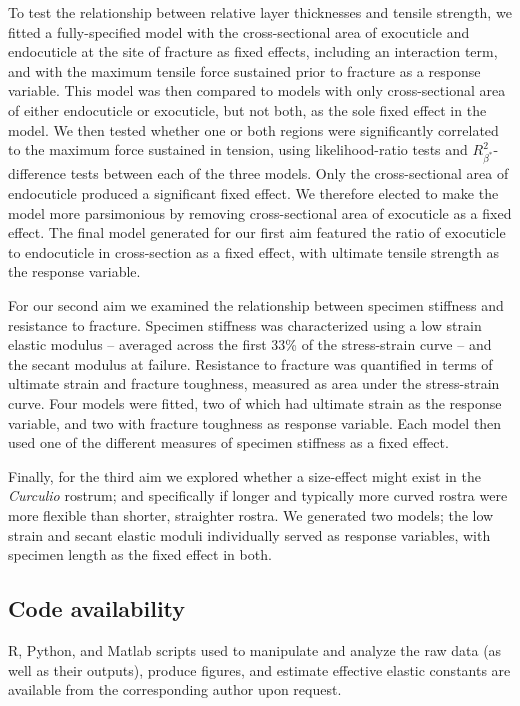 \documentclass[twocolumn, linenumbers, superscriptaddress, nofootinbib]{revtex4-1}
\begin{document}
				To test the relationship between relative layer thicknesses and tensile strength, we fitted a fully-specified model with the cross-sectional area of exocuticle and endocuticle at the site of fracture as fixed effects, including an interaction term, and with the maximum tensile force sustained prior to fracture as a response variable.
				This model was then compared to models with only cross-sectional area of either endocuticle or exocuticle, but not both, as the sole fixed effect in the model.
				We then tested whether one or both regions were significantly correlated to the maximum force sustained in tension, using likelihood-ratio tests and $R^{2}_{\beta^*}$-difference tests between each of the three models.
				Only the cross-sectional area of endocuticle produced a significant fixed effect.
				We therefore elected to make the model more parsimonious by removing cross-sectional area of exocuticle as a fixed effect.
				The final model generated for our first aim featured the ratio of exocuticle to endocuticle in cross-section as a fixed effect, with ultimate tensile strength as the response variable.
				
				For our second aim we examined the relationship between specimen stiffness and resistance to fracture.
				Specimen stiffness was characterized using a low strain elastic modulus -- averaged across the first 33\% of the stress-strain curve -- and the secant modulus at failure.
				Resistance to fracture was quantified in terms of ultimate strain and fracture toughness, measured as area under the stress-strain curve.
				Four models were fitted, two of which had ultimate strain as the response variable, and two with fracture toughness as response variable.
				Each model then used one of the different measures of specimen stiffness as a fixed effect.
				
				Finally, for the third aim we explored whether a size-effect might exist in the \textit{Curculio} rostrum; and specifically if longer and typically more curved rostra were more flexible than shorter, straighter rostra.
				We generated two models; the low strain and secant elastic moduli individually served as response variables, with specimen length as the fixed effect in both.

		\subsection*{Code availability}
			R, Python, and Matlab scripts used to manipulate and analyze the raw data (as well as their outputs), produce figures, and estimate effective elastic constants are available from the corresponding author upon request.
			
\end{document}

